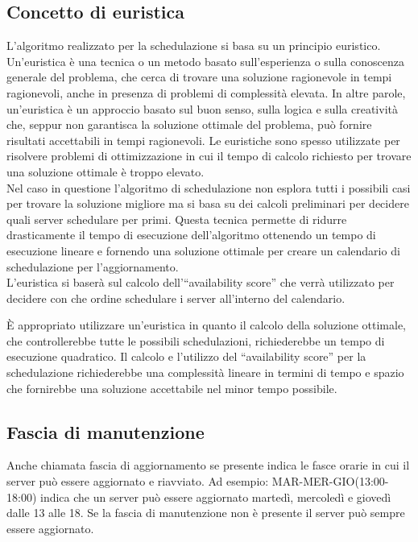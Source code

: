 \subsection{Concetto di euristica}
L’algoritmo realizzato per la schedulazione si basa su un principio euristico. 
Un'euristica è una tecnica o un metodo basato sull'esperienza o sulla 
conoscenza generale del problema, che cerca di trovare una soluzione 
ragionevole in tempi ragionevoli, anche in presenza di problemi di 
complessità elevata. In altre parole, un'euristica è un approccio basato 
sul buon senso, sulla logica e sulla creatività che, seppur non garantisca la 
soluzione ottimale del problema, può fornire risultati accettabili in tempi 
ragionevoli. Le euristiche sono spesso utilizzate per risolvere problemi di 
ottimizzazione in cui il tempo di calcolo richiesto per trovare una soluzione 
ottimale è troppo elevato.\\

Nel caso in questione l’algoritmo di schedulazione non esplora tutti i possibili 
casi per trovare la soluzione migliore ma si basa su dei calcoli preliminari 
per decidere quali server schedulare per primi.
Questa tecnica permette di ridurre drasticamente il tempo di esecuzione 
dell’algoritmo ottenendo un tempo di esecuzione lineare e fornendo una 
soluzione ottimale per creare un calendario di schedulazione per l’aggiornamento.\\

L’euristica si baserà sul calcolo dell’“availability score” che verrà utilizzato 
per decidere con che ordine schedulare i server all’interno del calendario.

È appropriato utilizzare un’euristica in quanto il calcolo della soluzione 
ottimale, che controllerebbe tutte le possibili schedulazioni, richiederebbe un 
tempo di esecuzione quadratico. Il calcolo e l’utilizzo del “availability score” 
per la schedulazione richiederebbe una complessità lineare in termini di tempo e 
spazio che fornirebbe una soluzione accettabile nel minor tempo possibile.


\subsection{Fascia di manutenzione}
Anche chiamata fascia di aggiornamento se presente indica le fasce orarie 
in cui il server può essere aggiornato e riavviato. 
Ad esempio: MAR-MER-GIO(13:00-18:00) indica che un server può essere 
aggiornato martedì, mercoledì e giovedì dalle 13 alle 18.
Se la fascia di manutenzione non è presente il server può sempre essere aggiornato.

